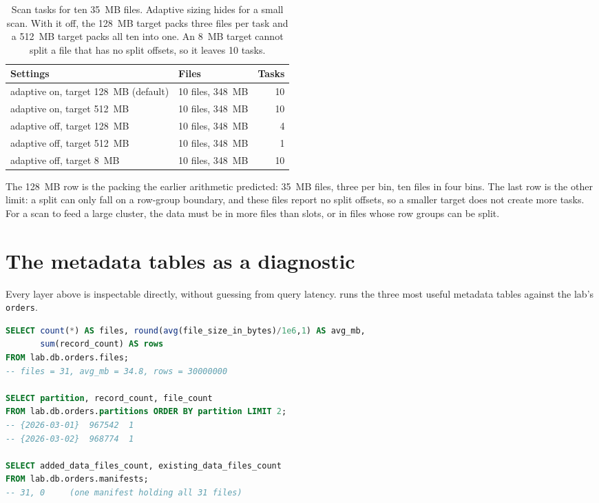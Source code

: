 \begin{table}[htbp]
\centering\footnotesize
\renewcommand{\arraystretch}{1.25}
\begin{tabular}{@{}P{5.2cm}P{3.0cm}r@{}}
\toprule
\textbf{Settings} & \textbf{Files} & \textbf{Tasks} \\
\midrule
adaptive on, target 128~MB (default) & 10 files, 348~MB & 10 \\
adaptive on, target 512~MB & 10 files, 348~MB & 10 \\
adaptive off, target 128~MB & 10 files, 348~MB & 4 \\
adaptive off, target 512~MB & 10 files, 348~MB & 1 \\
adaptive off, target 8~MB & 10 files, 348~MB & 10 \\
\bottomrule
\end{tabular}
\caption{Scan tasks for ten 35~MB files. Adaptive sizing hides
 for a small scan. With it off, the 128~MB target
packs three files per task and a 512~MB target packs all ten into one. An 8~MB
target cannot split a file that has no split offsets, so it leaves 10 tasks.}
\label{tab:ice-lab-splits}
\end{table}

The 128~MB row is the packing the earlier arithmetic predicted: 35~MB files, three
per bin, ten files in four bins. The last row is the other limit: a split can
only fall on a row-group boundary, and these files report no split offsets, so a
smaller target does not create more tasks. For a scan to feed a large cluster,
the data must be in more files than slots, or in files whose row groups can be
split.

\section{The metadata tables as a diagnostic}
\label{sec:ice-read-metadata-tables}

Every layer above is inspectable directly, without guessing from query latency.
 runs the three most useful metadata tables against the
lab's \texttt{orders}.

\begin{lstlisting}[language=SQL,numbers=none,style=plan,caption={Three metadata tables on \texttt{orders}, with the lab's output},captionpos=b,label=lst:ice-read-meta]
SELECT count(*) AS files, round(avg(file_size_in_bytes)/1e6,1) AS avg_mb,
       sum(record_count) AS rows
FROM lab.db.orders.files;
-- files = 31, avg_mb = 34.8, rows = 30000000

SELECT partition, record_count, file_count
FROM lab.db.orders.partitions ORDER BY partition LIMIT 2;
-- {2026-03-01}  967542  1
-- {2026-03-02}  968774  1

SELECT added_data_files_count, existing_data_files_count
FROM lab.db.orders.manifests;
-- 31, 0     (one manifest holding all 31 files)
\end{lstlisting}

